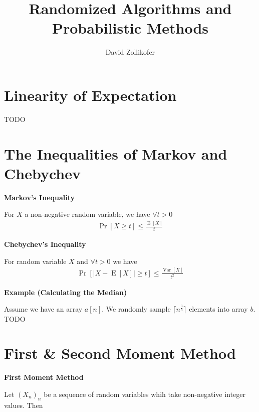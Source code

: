 \documentclass[25pt]{sciposter}
\title{\huge{Randomized Algorithms and Probabilistic Methods}}
\author{\large{David Zollikofer}}
\newcommand{\Var}{\operatorname{Var}}
\newcommand{\E}{\operatorname{E}}
\newenvironment{method}[1]{\begin{mdframed}[backgroundcolor=blue!10,innertopmargin=15pt, innerbottommargin=15pt,nobreak=true]
		\textbf{#1 }
	}
	{ 
	\end{mdframed}
}
\begin{document}
	
	
	
	
	
	\maketitle
	
	
	
	\begin{multicols}{3}
		
		\section{Linearity of Expectation}
		TODO
		
		\section{The Inequalities of Markov and Chebychev}
		
		\begin{method}{Markov's Inequality}
			For $X$ a non-negative random variable, we have $\forall t > 0$
			\begin{align*}
				\Pr[X \geq t ]\leq \frac{\E[X]}{t}
			\end{align*}
		\end{method}
		
		
		\begin{method}{Chebychev's Inequality}
		For random variable $X$ and $\forall t > 0$ we have 
		\begin{align*}
			\Pr[|X-\E[X]| \geq  t] \leq \frac{\Var[X]}{t^2}
		\end{align*} 
	\end{method}

\textbf{Example (Calculating the Median)} 

Assume we have an array $a[n]$. We randomly sample $\lceil n^{\frac{3}{4}} \rceil $ elements into array $b$. TODO

 

		\section{First \& Second Moment Method}
		
		\begin{method}{First Moment Method}
			Let $(X_n)_n$ be a sequence of random variables whih take non-negative integer values. Then 
			\begin{equation}
				\
			\end{equation}
		\end{method}
	

\end{multicols}
\end{document}
